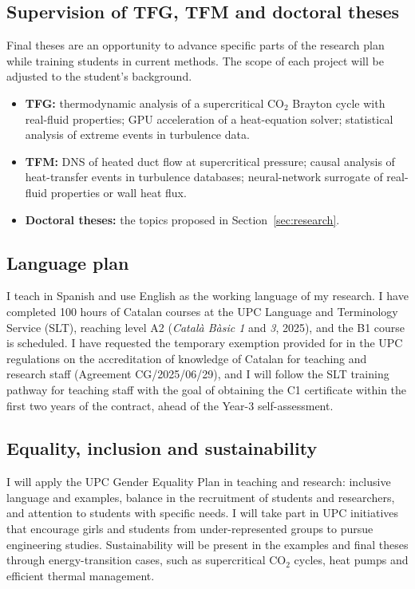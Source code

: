 \documentclass[11pt]{article}
\begin{document}
\subsection{Supervision of TFG, TFM and doctoral theses}\label{sec:theses}
Final theses are an opportunity to advance specific parts of the research plan while
training students in current methods. The scope of each project will be adjusted to the
student's background.
\begin{itemize}
  \item \textbf{TFG:} thermodynamic analysis of a supercritical CO$_2$ Brayton cycle with
  real-fluid properties; GPU acceleration of a heat-equation solver; statistical analysis
  of extreme events in turbulence data.
  \item \textbf{TFM:} DNS of heated duct flow at supercritical pressure; causal analysis of
  heat-transfer events in turbulence databases; neural-network surrogate of real-fluid
  properties or wall heat flux.
  \item \textbf{Doctoral theses:} the topics proposed in Section~\ref{sec:research}.
\end{itemize}

\subsection{Language plan}
I teach in Spanish and use English as the working language of my research. I have
completed 100 hours of Catalan courses at the UPC Language and Terminology Service (SLT),
reaching level A2 (\emph{Catal\`a B\`asic 1} and \emph{3}, 2025), and the B1 course is
scheduled. I have requested the temporary exemption provided for in the UPC regulations on
the accreditation of knowledge of Catalan for teaching and research staff (Agreement
CG/2025/06/29), and I will follow the SLT training pathway for teaching staff with the goal
of obtaining the C1 certificate within the first two years of the contract, ahead of the
Year-3 self-assessment. 

\subsection{Equality, inclusion and sustainability}
I will apply the UPC Gender Equality Plan in teaching and research: inclusive language and
examples, balance in the recruitment of students and researchers, and attention to
students with specific needs. I will take part in UPC initiatives that encourage girls and
students from under-represented groups to pursue engineering studies. Sustainability will
be present in the examples and final theses through energy-transition cases, such as
supercritical CO$_2$ cycles, heat pumps and efficient thermal management.
\end{document}
